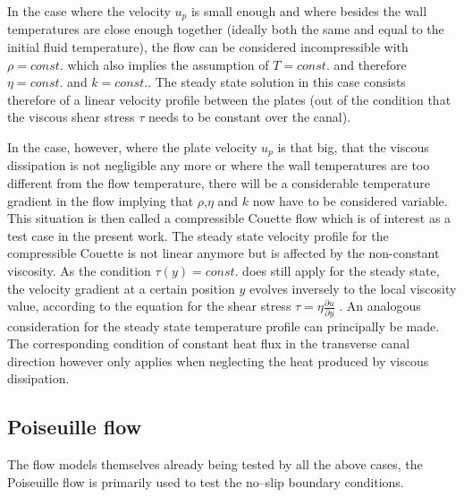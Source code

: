 \documentclass[11pt,a4paper,twoside]{report}
\begin{document}
In the case where the velocity $u_p$ is small enough and where besides the wall temperatures are close enough together (ideally both the same and equal to the initial fluid temperature), the flow can be considered incompressible with $\rho=const.$ which also implies the assumption of $T=const$. and therefore $\eta=const.$ and $k=const.$. The steady state solution in this case consists therefore of a linear velocity profile between the plates (out of the condition that the viscous shear stress $\tau$ needs to be constant over the canal).

In the case, however, where the plate velocity $u_p$ is that big, that the viscous dissipation is not negligible any more or where the wall temperatures are too different from the flow temperature, there will be a considerable temperature gradient in the flow implying that $\rho$,$\eta$ and $k$ now have to be considered variable. This situation is then called a compressible Couette flow which is of interest as a test case in the present work.
The steady state velocity profile for the compressible Couette is not linear anymore but is affected by the non-constant viscosity. As the condition $\tau(y)=const.$ does still apply for the steady state, the velocity gradient at a certain position $y$ evolves inversely to the local viscosity value, according to the equation for the shear stress $\tau=\eta \frac{\partial u}{\partial y}$ \cite{Anderson2001}. 
An analogous consideration for the steady state temperature profile can principally be made. The corresponding condition of constant heat flux in the transverse canal direction however only applies when neglecting the heat produced by viscous dissipation. 


\subsection{Poiseuille flow}
\label{sec:genIntroPoiseuille}
The flow models themselves already being tested by all the above cases, the Poiseuille flow is primarily used to test the no--slip boundary conditions. 
\end{document}
